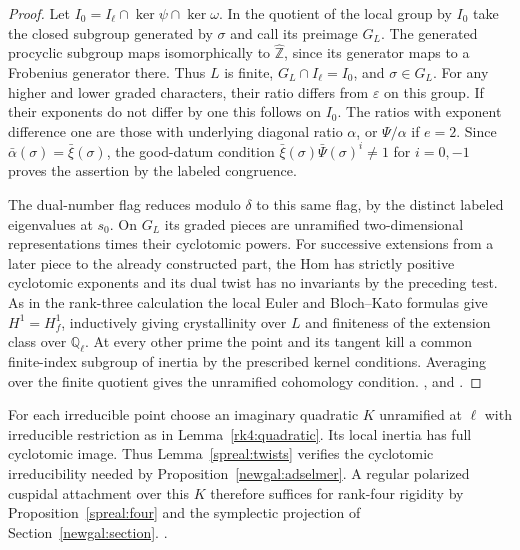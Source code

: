 \begin{proof}
Let \(I_0=I_\ell\cap\ker\psi\cap\ker\omega\). In the quotient of
the local group by \(I_0\) take the closed subgroup generated by
\(\sigma\) and call its preimage \(G_L\). The generated procyclic
subgroup maps isomorphically to \(\widehat{\mathbb Z}\), since its
generator maps to a Frobenius generator there. Thus \(L\) is finite,
\(G_L\cap I_\ell=I_0\), and \(\sigma\in G_L\).
For any higher and lower graded characters, their ratio differs from
\(\varepsilon\) on this group. If their exponents do not differ
by one this follows on \(I_0\). The ratios with exponent difference
one are those with underlying diagonal ratio \(\alpha\), or
\(\Psi/\alpha\) if \(e=2\). Since \(\bar\alpha(\sigma)=
\bar\xi(\sigma)\), the good-datum condition
\(\bar\xi(\sigma)\bar\Psi(\sigma)^i\ne1\) for \(i=0,-1\)
proves the assertion by the labeled congruence.

The dual-number flag reduces modulo \(\delta\) to this same flag,
by the distinct labeled eigenvalues at \(s_0\). On \(G_L\) its
graded pieces are unramified two-dimensional representations times
their cyclotomic powers. For successive extensions from a later
piece to the already constructed part, the Hom has strictly positive
cyclotomic exponents and its dual twist has no invariants by the
preceding test. As in the rank-three calculation the local Euler
and Bloch--Kato formulas give \(H^1=H^1_f\), inductively giving
crystallinity over \(L\) and finiteness of the extension class over
\(\mathbb Q_\ell\). At every other prime the point and its tangent
kill a common finite-index subgroup of inertia by the prescribed
kernel conditions. Averaging over the finite quotient gives the
unramified cohomology condition.
,
and .
\end{proof}

For each irreducible point choose an imaginary quadratic \(K\)
unramified at \(\ell\) with irreducible restriction as in
Lemma~\ref{rk4:quadratic}. Its local inertia has full cyclotomic
image. Thus Lemma~\ref{spreal:twists} verifies the cyclotomic
irreducibility needed by Proposition~\ref{newgal:adselmer}.
A regular polarized cuspidal attachment over this \(K\) therefore
suffices for rank-four rigidity by Proposition~\ref{spreal:four}
and the symplectic projection of
Section~\ref{newgal:section}.
.

